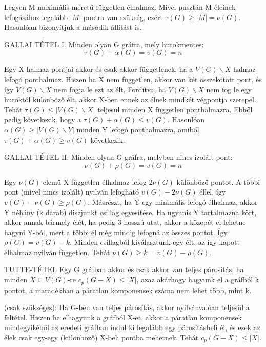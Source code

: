 \begin{bizonyitas}{}
Legyen M maximális méretű független élhalmaz. Mivel pusztán M éleinek lefogásához legalább $|M|$ pontra van szükség, ezért $\tau(G) \geq |M| = \nu(G)$.
Hasonlóan bizonyítjuk a második állítást is.
\end{bizonyitas}

\begin{tetel}{GALLAI TÉTEL I.}
Minden olyan G gráfra, mely hurokmentes:
$$\tau(G) + \alpha(G) = v(G) = n$$
\end{tetel}

\begin{bizonyitas}{}
Egy X halmaz pontjai akkor és csak akkor függetlenek, ha a $V(G)\backslash X$ halmaz lefogó ponthalmaz. Hiszen ha X nem független, akkor van két összekötött pont, és így $V(G)\backslash X$ nem fogja le ezt az élt. Fordítva, ha $V(G)\backslash X$ nem fog le egy huroktól különböző élt, akkor X-ben ennek az élnek mindkét végpontja szerepel. Tehát $\tau(G) \leq |V(G)\backslash X|$ teljesül minden X független ponthalmazra. Ebből pedig következik, hogy a $\tau(G) + \alpha(G) \leq v(G)$. Hasonlóan $\alpha(G) \geq |V(G) \backslash Y|$ minden Y lefogó ponthalmazra, amiből $\tau(G) + \alpha(G) \geq v(G)$ következik.
\end{bizonyitas}

\begin{tetel}{GALLAI TÉTEL II.}
Minden olyan G gráfra, melyben nincs izolált pont:
$$\nu(G) + \rho(G) = v(G) = n$$
\end{tetel}

\begin{bizonyitas}{}
Egy $\nu(G)$ elemű X független élhalmaz lefog $2\nu(G)$ különböző pontot. A többi pont (mivel nincs izolált) nyilván lefogható $v(G) - 2\nu(G)$ éllel, így $v(G) - \nu(G) \geq \rho(G)$. Másrészt, ha Y egy minimális lefogó élhalmaz, akkor Y néhány (k darab) diszjunkt csillag egyesítése. Ha ugyanis Y tartalmazna kört, akkor annak bármely élét, ha pedig 3 hosszú utat, akkor a közepét el lehetne hagyni Y-ból, mert a többi él még mindig lefogná az összes pontot. Így $\rho(G) = v(G) - k$. Minden csillagból kiválasztunk egy élt, az így kapott élhalmaz nyilván független. Tehát $\nu(G) \geq k = v(G) - \rho(G)$.
\end{bizonyitas}

\begin{tetel}{TUTTE-TÉTEL}
Egy G gráfban akkor és csak akkor van teljes párosítás, ha minden $X \subseteq V(G)$-re $c_p(G - X)\leq |X|$, azaz akárhogy hagyunk el a gráfból k pontot, a maradékban a páratlan komponensek száma nem lehet több, mint k.
\end{tetel}

\begin{bizonyitas}{}
(csak szükséges): Ha G-ben van teljes párosítás, akkor nyilvánvalóan teljesül a feltétel. Hiszen ha elhagyunk a gráfból X-et, akkor a páratlan komponensek mindegyikéből az eredeti gráfban indul ki legalább egy párosításbeli él, és ezek az élek csak egy-egy (különböző) X-beli pontba mehetnek. Tehát $c_p(G - X) \leq |X|$.
\end{bizonyitas}
